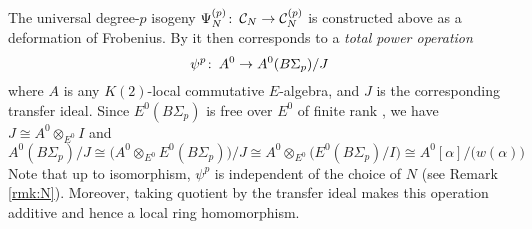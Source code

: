 \documentclass{gtpart}
\theoremstyle{definition}
\theoremstyle{remark}
\def\co{\colon\thinspace}
\newcommand{\CC}{{\cal C}}
\newcommand{\A}{\alpha}
\renewcommand{\=}{\approx}
\renewcommand{\-}{\sim}
\numberwithin{equation}{section}
\begin{document}
The universal degree-$p$ isogeny $\Psi_N^{(p)} \co \CC_N \to \CC_N^{(p)}$ is 
constructed above as a deformation of Frobenius.  By \cite[Theorem B]{cong} it 
then corresponds to a {\em total power operation} 
\begin{equation}
 \label{psi}
 \psi^p \co A^0 \to A^0(B\Sigma_p) / J 
\end{equation}
where $A$ is any $K(2)$-local commutative $E$-algebra, and $J$ is the 
corresponding transfer ideal.  Since $E^0(B\Sigma_p)$ is free over $E^0$ of 
finite rank \cite[Theorem 3.2]{Str98}, we have $J \cong A^0 \otimes_{E^0} I$ and 
\[
 A^0(B\Sigma_p) / J \cong \big( A^0 \otimes_{E^0} E^0(B\Sigma_p) \big) / J \cong 
 A^0 \otimes_{E^0} \big( E^0(B\Sigma_p) / I \big) \cong 
 A^0[\A] / \big( w(\A) \big) 
\]
Note that up to isomorphism, $\psi^p$ is independent of the choice of $N$ (see 
Remark \ref{rmk:N}).  Moreover, taking quotient by the transfer ideal makes this 
operation additive and hence a local ring homomorphism.  
\end{document}
